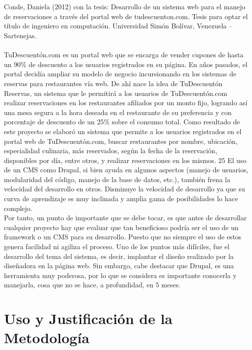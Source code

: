 \begin{large}
\\
\\
Conde, Daniela (2012) con la tesis: Desarrollo de un sistema web para el manejo de reservaciones a través del portal web de tudescuenton.com. Tesis para optar el título de ingeniero en computación. Universidad Simón Bolívar, Venezuela – Sartenejas. 
\\
\\
TuDescuentón.com es un portal web que se encarga de vender cupones de hasta un 90\% de descuento a los usuarios registrados en su página. En años pasados, el portal decidía ampliar su modelo de negocio incursionando en los sistemas de reservas para restaurantes vía web. De ahí nace la idea de TuDescuentón Reservas, un sistema que le permitirá a los usuarios de TuDescuentón.com realizar reservaciones en los restaurantes afiliados por un monto fijo, logrando así una mesa segura a la hora deseada en el restaurante de su preferencia y con porcentaje de descuento de un 25\% sobre el consumo total. Como resultado de este proyecto se elaboró un sistema que permite a los usuarios registrados en el portal web de TuDescuentón.com, buscar restaurantes por nombre, ubicación, especialidad culinaria, más reservados, según la fecha de la reservación, disponibles por día, entre otros, y realizar reservaciones en los mismos. 25 El uso de un CMS como Drupal, si bien ayuda en algunos aspectos (manejo de usuarios, modularidad del código, manejo de la base de datos, etc.), también frena la velocidad del desarrollo en otros. Disminuye la velocidad de desarrollo ya que su curva de aprendizaje es muy inclinada y amplia gama de posibilidades lo hace complejo.
\\
Por tanto, un punto de importante que se debe tocar, es que antes de desarrollar cualquier proyecto hay que evaluar que tan beneficioso podría ser el uso de un framework o un CMS para su desarrollo. Puesto que no siempre el uso de estos genera facilidad ni agiliza el proceso. Uno de los puntos más difíciles, fue el desarrollo del tema del sistema, es decir, implantar el diseño realizado por la diseñadora en la página web. Sin embargo, cabe destacar que Drupal, es una herramienta muy poderosa, por lo que se considera es importante conocerla y manejarla, cosa que no se hace, a profundidad, en 5 meses.

\section{Uso y Justificación de la Metodología}

\end{large}
\newpage
